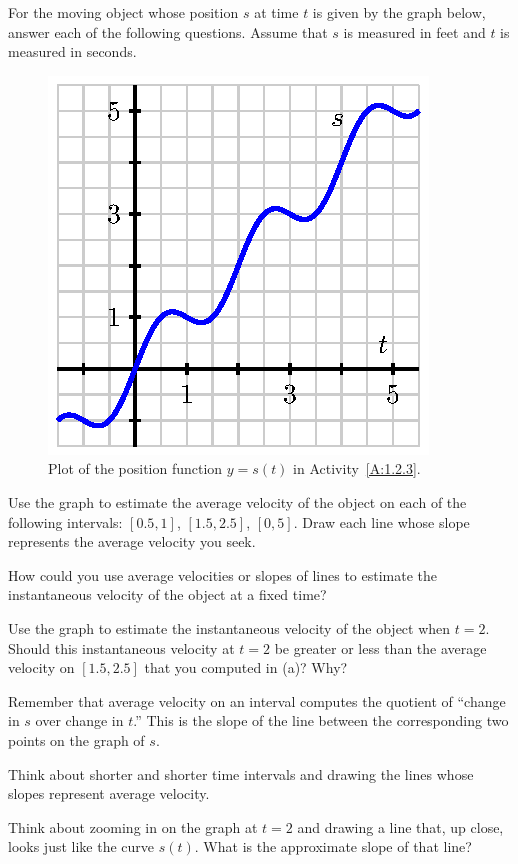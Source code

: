 \begin{activity} \label{A:1.2.3}
For the moving object whose position $s$ at time $t$ is given by the graph below, answer each of the following questions.  Assume that $s$ is measured in feet and $t$ is measured in seconds.
\begin{figure}[h]
\begin{center}
 \includegraphics{figures/1_2_Act3.eps} \caption{Plot of the position function $y = s(t)$ in Activity~\ref{A:1.2.3}.}
\end{center}
\end{figure}
\ba
	\item Use the graph to estimate the average velocity of the object on each of the following intervals: $[0.5,1]$, $[1.5,2.5]$, $[0,5]$.  Draw each line whose slope represents the average velocity you seek.
	\item How could you use average velocities or slopes of lines to estimate the instantaneous velocity of the object at a fixed time?
	\item Use the graph to estimate the instantaneous velocity of the object when $t = 2$.  Should this instantaneous velocity at $t = 2$ be greater or less than the average velocity on $[1.5,2.5]$ that you computed in (a)?  Why?
\ea
\end{activity} 
\begin{smallhint}
\ba
	\item Remember that average velocity on an interval computes the quotient of ``change in $s$ over change in $t$.''  This is the slope of the line between the corresponding two points on the graph of $s$.
	\item Think about shorter and shorter time intervals and drawing the lines whose slopes represent average velocity.
	\item Think about zooming in on the graph at $t = 2$ and drawing a line that, up close, looks just like the curve $s(t)$.  What is the approximate slope of that line?
\ea
\end{smallhint}
